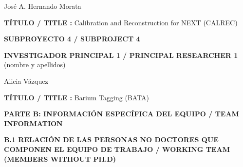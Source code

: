 \documentclass[a4paper,11pt,oneside]{article}
\begin{document}
\vspace{6pt}
\noindent José A. Hernando Morata

\vspace{6pt}
\noindent\textbf{TÍTULO / TITLE :} Calibration and Reconstruction for NEXT (CALREC)

\vspace{12pt}
\noindent\textbf{SUBPROYECTO 4 / SUBPROJECT 4}
\vspace{6pt}

\noindent\textbf{INVESTIGADOR PRINCIPAL 1 / PRINCIPAL RESEARCHER 1 } (nombre y apellidos)

\vspace{6pt}
\noindent Alicia Vázquez

\vspace{6pt}
\noindent\textbf{TÍTULO / TITLE :} Barium Tagging (BATA)



\newpage
\setcounter{page}{1}


\begin{tcolorbox}[colback=yellow,arc=0pt,outer arc=0pt,colframe=black,boxrule=0.6pt,left=0mm]
  \noindent\textbf{PARTE B: INFORMACIÓN ESPECÍFICA DEL EQUIPO / TEAM INFORMATION}
\end{tcolorbox}

\vspace{12pt}
\noindent\textbf{B.1 RELACIÓN DE LAS PERSONAS NO DOCTORES QUE COMPONEN EL EQUIPO DE TRABAJO / WORKING TEAM (MEMBERS WITHOUT PH.D) }



\end{document}
